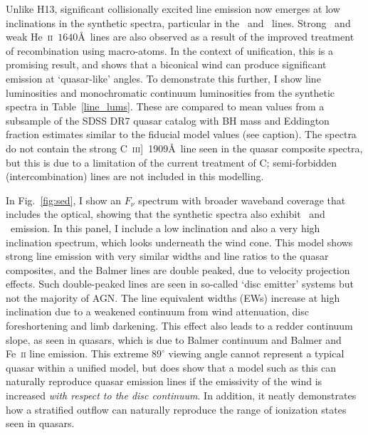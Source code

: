 Unlike H13, significant collisionally excited line emission now emerges
at low inclinations in the synthetic spectra, particular in the \civ\ and \nv\
lines. Strong \la\ and
weak He~\textsc{ii}~$1640$\AA\ lines are also observed
as a result of the improved treatment of recombination using macro-atoms. 
In the context of unification, this is a promising result, 
and shows that a biconical wind can produce significant 
emission at `quasar-like' angles. To demonstrate this further,
I show line luminosities and monochromatic continuum luminosities
from the synthetic spectra in Table~\ref{line_lums}. These are compared to
mean values from a subsample of the SDSS DR7 quasar catalog \citep{shen2011} 
with BH mass and Eddington fraction estimates similar to the fiducial model values 
(see caption). The spectra do not contain the strong 
C~\textsc{iii}]~1909\AA\ line seen in the quasar composite spectra, 
but this is due to a limitation of the current treatment of C; semi-forbidden
(intercombination) lines are not included in this modelling.

In Fig.~\ref{fig:sed}, I show an $F_{\nu}$ spectrum with broader waveband coverage
that includes the optical, showing that the synthetic spectra 
also exhibit \ha\ and \hb\ emission. 
In this panel, I include a low inclination and 
also a very high inclination 
spectrum, which looks underneath the wind cone. This model shows 
strong line emission with very similar widths and line ratios to the quasar composites, and
the Balmer lines are double peaked, due to velocity projection effects.  
Such double-peaked lines are seen in so-called `disc emitter' systems 
\citep[e.g.][]{eracleous1994} but not the majority of AGN.     
The line equivalent widths (EWs) increase at high inclination
due to a weakened continuum from wind attenuation, 
disc foreshortening and limb darkening. This effect also 
leads to a redder continuum slope, as seen in quasars, which is
due to Balmer continuum and Balmer and Fe~\textsc{ii} line emission.
This extreme $89^\circ$ viewing angle cannot represent a typical quasar within a unified model,
but does show that a model such as this can naturally reproduce quasar emission lines
if the emissivity of the wind is increased {\em with respect to the disc continuum}.
In addition, it neatly demonstrates how a stratified outflow can naturally
reproduce the range of ionization states seen in quasars. 

